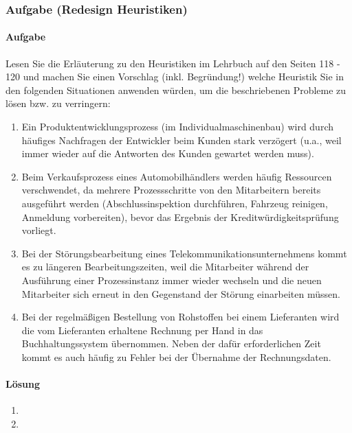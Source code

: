 \subsubsection*{Aufgabe (Redesign Heuristiken)}
\paragraph*{Aufgabe}
    Lesen Sie die Erläuterung zu den Heuristiken im Lehrbuch auf den Seiten 118 - 120 und machen Sie einen Vorschlag (inkl. Begründung!) welche Heuristik Sie in den folgenden Situationen anwenden würden, um die beschriebenen Probleme zu lösen bzw. zu verringern:
    
    \begin{enumerate}[label=\alph*)]
        \item Ein Produktentwicklungsprozess (im Individualmaschinenbau) wird durch häufiges Nachfragen der Entwickler beim Kunden stark verzögert (u.a., weil immer wieder auf die Antworten des Kunden gewartet werden muss).
        \item Beim Verkaufsprozess eines Automobilhändlers werden häufig Ressourcen verschwendet, da mehrere Prozessschritte von den Mitarbeitern bereits ausgeführt werden (Abschlussinspektion durchführen, Fahrzeug reinigen, Anmeldung vorbereiten), bevor das Ergebnis der Kreditwürdigkeitsprüfung vorliegt.
        \item Bei der Störungsbearbeitung eines Telekommunikationsunternehmens kommt es zu längeren Bearbeitungszeiten, weil die Mitarbeiter während der Ausführung einer Prozessinstanz immer wieder wechseln und die neuen Mitarbeiter sich erneut in den Gegenstand der Störung einarbeiten müssen.
        \item Bei der regelmäßigen Bestellung von Rohstoffen bei einem Lieferanten wird die vom Lieferanten erhaltene Rechnung per Hand in das Buchhaltungssystem übernommen. Neben der dafür erforderlichen Zeit kommt es auch häufig zu Fehler bei der Übernahme der Rechnungsdaten.
    \end{enumerate}

\paragraph*{Lösung}
    \begin{enumerate}[label=\alph*)]
        \item 
        \item 
    \end{enumerate}

